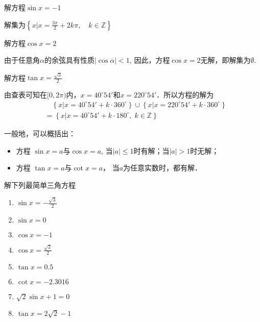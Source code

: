 \begin{example}
    解方程$\sin x=-1$
\end{example}

\begin{solution}
    解集为$\left\{x\Big|x=\frac{3\pi}{2}+2k\pi,\quad k\in\mathbb{Z}\right\}$
\end{solution}

\begin{example}
    解方程$\cos x=2$
\end{example}

\begin{solution}
    由于任意角$\alpha$的余弦具有性质$|\cos\alpha|<1$, 因此，方程$\cos x=2$无解，即解集为$\emptyset$.
\end{solution}

\begin{example}
    解方程$\tan x=\frac{\sqrt{3}}{2}$
\end{example}

\begin{solution}
    由查表可知在$[0, 2\pi)$内，$x=40^{\circ}54'$和$x=220^{\circ}54'$．所以方程的解为
\[\begin{split}
   & \quad \left\{x\Big|x=40^{\circ}54'+k\cdot 360^{\circ}\right\} \cup \left\{x\Big|x=220^{\circ}54'+k\cdot 360^{\circ}\right\}\\
   &=\left\{x\Big|x=40^{\circ}54'+k\cdot 180^{\circ},\; k\in\mathbb{Z}\right\}
\end{split}\]
\end{solution}

一般地，可以概括出：
\begin{itemize}
    \item 方程 $\sin x=a$与$\cos x=a$, 当$|a|\le 1$时有解；当$|a|>1$时无解；
    \item 方程 $\tan x=a$与$\cot x=a$， 当$a$为任意实数时，都有解．
\end{itemize}

\begin{ex}
    解下列最简单三角方程
\begin{multicols}{2}
\begin{enumerate}
    \item $\sin x=-\frac{\sqrt{3}}{2}$
    \item $\sin x=0$
    \item $\cos x=-1$
    \item $\cos x=\frac{\sqrt{2}}{2}$
    \item $\tan x=0.5$
    \item $\cot x=-2.3016$
    \item $\sqrt{2}\sin x+1=0$
    \item $\tan x=2\sqrt{2}-1$
\end{enumerate}
\end{multicols}
\end{ex}

